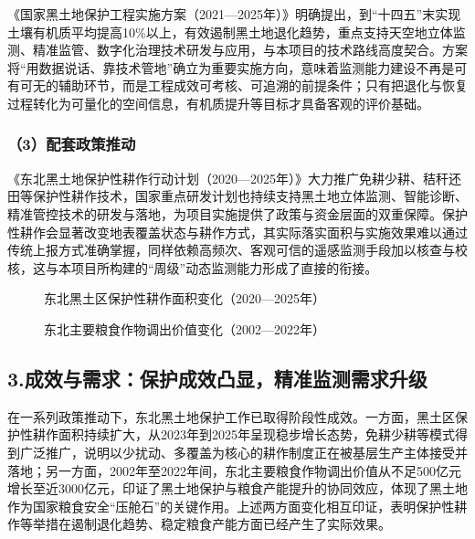 \documentclass[12pt, a4paper]{ctexart}
\begin{document}
《国家黑土地保护工程实施方案（2021—2025年）》明确提出，到“十四五”末实现土壤有机质平均提高10\%以上，有效遏制黑土地退化趋势，重点支持天空地立体监测、精准监管、数字化治理技术研发与应用，与本项目的技术路线高度契合。方案将“用数据说话、靠技术管地”确立为重要实施方向，意味着监测能力建设不再是可有可无的辅助环节，而是工程成效可考核、可追溯的前提条件；只有把退化与恢复过程转化为可量化的空间信息，有机质提升等目标才具备客观的评价基础。

\subsubsection{（3）配套政策推动}

《东北黑土地保护性耕作行动计划（2020—2025年）》大力推广免耕少耕、秸秆还田等保护性耕作技术，国家重点研发计划也持续支持黑土地立体监测、智能诊断、精准管控技术的研发与落地，为项目实施提供了政策与资金层面的双重保障。保护性耕作会显著改变地表覆盖状态与耕作方式，其实际落实面积与实施效果难以通过传统上报方式准确掌握，同样依赖高频次、客观可信的遥感监测手段加以核查与校核，这与本项目所构建的“周级”动态监测能力形成了直接的衔接。

\begin{figure}[htbp]
    \centering
    \caption{东北黑土区保护性耕作面积变化（2020—2025年）}
    \label{fig:2}
\end{figure}

\begin{figure}[htbp]
    \centering
    \caption{东北主要粮食作物调出价值变化（2002—2022年）}
    \label{fig:3}
\end{figure}

\subsection{3.成效与需求：保护成效凸显，精准监测需求升级}

在一系列政策推动下，东北黑土地保护工作已取得阶段性成效。一方面，黑土区保护性耕作面积持续扩大，从2023年到2025年呈现稳步增长态势，免耕少耕等模式得到广泛推广，说明以少扰动、多覆盖为核心的耕作制度正在被基层生产主体接受并落地；另一方面，2002年至2022年间，东北主要粮食作物调出价值从不足500亿元增长至近3000亿元，印证了黑土地保护与粮食产能提升的协同效应，体现了黑土地作为国家粮食安全“压舱石”的关键作用。上述两方面变化相互印证，表明保护性耕作等举措在遏制退化趋势、稳定粮食产能方面已经产生了实际效果。
\end{document}
